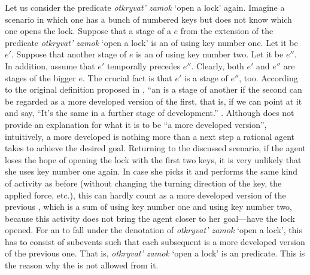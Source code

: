 \documentclass[output=paper,colorlinks,citecolor=brown,newtxmath]{langsci/langscibook}
\begin{document}
Let us consider the predicate \textit{otkryvat’ zamok} `open a lock' again. Imagine a scenario in which one has a bunch of numbered keys but does not know which one opens the lock. Suppose that a stage of a  $e$ from the extension of the predicate \textit{otkryvat’ zamok} `open a lock' is an  of using key number one. Let it be $e'$. Suppose that another stage of $e$ is an  of using key number two. Let it be $e''$. In addition, assume that $e'$ temporally precedes $e''$. Clearly, both $e'$ and $e''$ are stages of the bigger  $e$. The crucial fact is that $e'$ is a stage of $e''$, too. According to the original definition proposed in \citet{landman1992progressive}, ``an  is a stage of another  if the second can be regarded as a more developed version of the first, that is, if we can point at it and say, ``It's the same  in a further stage of development.'' \citep[23]{landman1992progressive}. Although \citet{landman1992progressive} does not provide an explanation for what it is to be ``a more developed version'', intuitively, a more developed  is nothing more than a next step a rational agent takes to achieve the desired goal. Returning to the discussed scenario, if the agent loses the hope of opening the lock with the first two keys, it is very unlikely that she uses key number one again. In case she picks it and performs the same kind of activity as before (without changing the turning direction of the key, the applied force, etc.), this can hardly count as a more developed version of the previous , which is a sum of using key number one and using key number two, because this activity does not bring the agent closer to her goal—have the lock opened. For an  to fall under the denotation of \textit{otkryvat’ zamok} `open a lock', this  has to consist of subevents such that each subsequent  is a more developed version of the previous one. That is, \textit{otkryvat’ zamok} `open a lock' is an  predicate. This is the reason why the  is not allowed from it.
\end{document}
